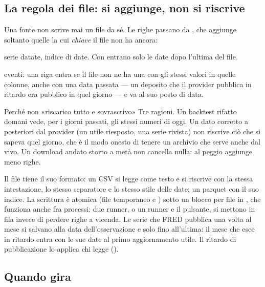 \subsection{La regola dei file: si aggiunge, non si riscrive}

Una fonte non scrive mai un file da sé. Le righe passano da
, che aggiunge soltanto quelle la cui
\emph{chiave} il file non ha ancora:

\begin{description}[leftmargin = 1.4em, style = nextline, itemsep = 4pt]
  \item[\cod{KEY = "index"}] serie datate, indice di date. Con
     entrano solo le date dopo l'ultima del file.
  \item[\cod{KEY = ["filing\_date", "period\_end"]}] eventi: una riga entra
    se il file non ne ha una con gli stessi valori in quelle colonne, anche
    con una data passata --- un deposito che il provider pubblica in ritardo
    era pubblico in quel giorno --- e va al suo posto di data.
\end{description}

\begin{perche}{Perché non «riscarico tutto e sovrascrivo»}
Tre ragioni. Un backtest rifatto domani vede, per i giorni passati, gli
stessi numeri di oggi. Un dato corretto a posteriori dal provider (un utile
riesposto, una serie rivista) non riscrive ciò che si sapeva quel giorno, che
è il modo onesto di tenere un archivio che serve anche dal vivo. Un download
andato storto a metà non cancella nulla: al peggio aggiunge meno righe.
\end{perche}

\noindent
Il file tiene il suo formato: un CSV si legge come testo e si riscrive con la
stessa intestazione, lo stesso separatore e lo stesso stile delle date; un
parquet con il suo indice. La scrittura è atomica (file temporaneo e
) sotto un blocco per file in , che funziona
anche fra processi: due runner, o un runner e il pulsante, si mettono in fila
invece di perdere righe a vicenda. Le serie che FRED pubblica una volta al
mese si salvano alla data dell'osservazione e solo fino all'ultima: il mese
che esce in ritardo entra con le sue date al primo aggiornamento utile. Il
ritardo di pubblicazione lo applica chi legge ().

\subsection{Quando gira}

